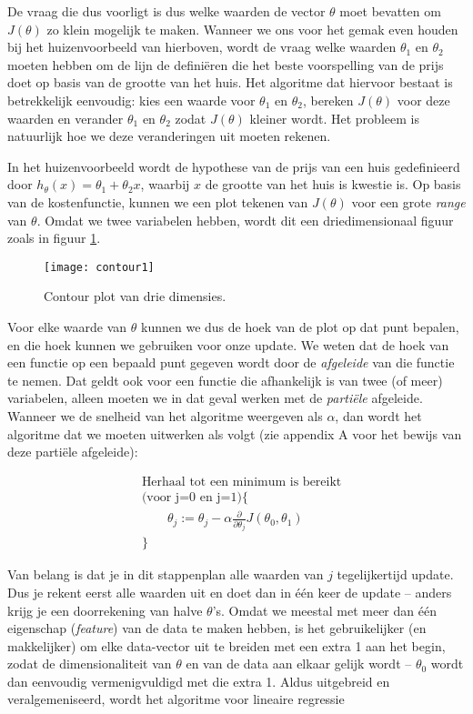 De vraag die dus voorligt is dus welke waarden de vector $\theta$ moet bevatten om $J(\theta)$ zo klein mogelijk te maken. Wanneer we ons voor het gemak even houden bij het huizenvoorbeeld van hierboven, wordt de vraag welke waarden $\theta_1$ en $\theta_2$ moeten hebben om de lijn de definiëren die het beste voorspelling van de prijs doet op basis van de grootte van het huis. Het algoritme dat hiervoor bestaat is betrekkelijk eenvoudig: kies een waarde voor $\theta_1$ en $\theta_2$, bereken $J(\theta)$ voor deze waarden en verander $\theta_1$ en $\theta_2$ zodat $J(\theta)$ kleiner wordt. Het probleem is natuurlijk hoe we deze veranderingen uit moeten rekenen.

In het huizenvoorbeeld wordt de hypothese van de prijs van een huis gedefinieerd door $h_{\theta}(x) = \theta_1 + \theta_2x$, waarbij $x$ de grootte van het huis is kwestie is. Op basis van de kostenfunctie, kunnen we een plot tekenen van $J(\theta)$ voor een grote \textit{range} van $\theta$. Omdat we twee variabelen hebben, wordt dit een driedimensionaal figuur zoals in figuur \ref{img:contour1}.

\begin{figure}[h]
\centering
\texttt{[image: contour1]}
\caption{Contour plot van drie dimensies.\label{img:contour1}}
\end{figure}

Voor elke waarde van $\theta$ kunnen we dus de hoek van de plot op dat punt bepalen, en die hoek kunnen we gebruiken voor onze update. We weten dat de hoek van een functie op een bepaald punt gegeven wordt door de \textit{afgeleide} van die functie te nemen. Dat geldt ook voor een functie die afhankelijk is van twee (of meer) variabelen, alleen moeten we in dat geval werken met de \textit{partiële} afgeleide. Wanneer we de snelheid van het algoritme weergeven als $\alpha$, dan wordt het algoritme dat we moeten uitwerken als volgt (zie appendix A voor het bewijs van deze partiële afgeleide):

\[
\begin{aligned}
&\textrm{Herhaal tot een minimum is bereikt} \\
& \textrm{(voor j=0 en j=1)} \{ \\
& \qquad\theta_j := \theta_j - \alpha \frac{\partial}{\partial\theta_j}J(\theta_0, \theta_1)\\
&\} 
\end{aligned}
\]



Van belang is dat je in dit stappenplan alle waarden van $j$ tegelijkertijd update. Dus je rekent eerst alle waarden uit en doet dan in één keer de update – anders krijg je een doorrekening van halve $\theta$'s. Omdat we meestal met meer dan één eigenschap (\textit{feature}) van de data te maken hebben, is het gebruikelijker (en makkelijker) om elke data-vector uit te breiden met een extra 1 aan het begin, zodat de dimensionaliteit van $\theta$ en van de data aan elkaar gelijk wordt – $\theta_0$ wordt dan eenvoudig vermenigvuldigd met die extra 1. Aldus uitgebreid en veralgemeniseerd, wordt het algoritme voor lineaire regressie

